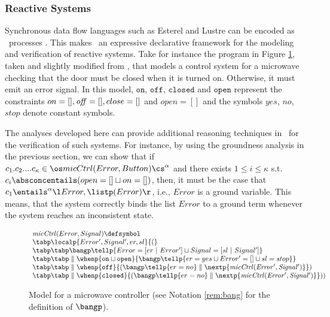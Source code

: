 \documentclass{tlp}
\begin{document}
\subsubsection{Reactive Systems} 
Synchronous data flow languages   \cite{BeGo92} such as Esterel and  Lustre  can be encoded as \tccp\ processes \cite{tcc-lics94,Tini99}. This  makes \tccp\ an expressive declarative framework for the modeling and verification of reactive systems. 
Take for instance the program in Figure \ref{fig:micro},
taken and slightly modified from \cite{FalaschiV06}, 
 that models a control system for a microwave checking  that the door must
be closed when it is turned on. Otherwise, it must emit an error signal. In this model, $\texttt{on}$, $\texttt{off}$, $\texttt{closed}$ and $\texttt{open}$ represent the constraints $on=[], {\it off}=[],close=[]$ and $open=[]$ and the symbols $yes$, $no$, $stop$ denote constant symbols. 

The analyses developed here  can provide additional reasoning techniques in \tccp\ for the verification of  such systems. For instance, by using the groundness analysis   in the previous section, we can show that if   $c_1.c_2....c_\kappa \in \os micCtrl(Error,Button)\cs^\alpha$ and there exists $1\leq i \leq \kappa$ s.t. $c_i \absconcentails (open=[] \sqcup on=[])$, then, it must be the case that  $c_1 \entails^{\alpha} \l Error , \listp(Error)\r$, i.e., $Error$ is  a ground variable. This means, that the system correctly binds the list $Error$ to a ground term whenever the system reaches an inconsistent state. 



\begin{figure}[t]
$
\begin{array}{ll}
 {\it micCtrl}(Error, Signal)  \defsymbol \\
\tabp  \localp{Error', Signal',er,sl}{(}\\
\tabp\tabp  \bangp \tellp{Error = [er \ | \ Error'] \sqcup  Signal = [sl \ |
\ Signal']} \\
\tabp\tabp  \parallel \whenp{\texttt{on} \sqcup \texttt{open}}
{\bangp\tellp{er= yes \sqcup Error' = [] \sqcup sl = {stop } }} \\
\tabp\tabp  \parallel \whenp{\texttt{off} }{(\bangp\tellp{er=no} \parallel
\nextp{\it micCtrl(Error',Signal')}}) \\
\tabp\tabp  \parallel \whenp{\texttt{closed}}{(\bangp\tellp{er=no} \parallel
\nextp{\it micCtrl(Error',Signal')}}))
\end{array}
$
\caption{Model for a microwave controller (see Notation  \ref{rem:bang} for the definition of $\bangp$).  \label{fig:micro} }
\end{figure}
\end{document}
